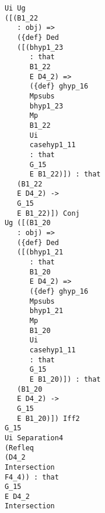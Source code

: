 \documentclass[12pt]{article}
\begin{document}
\begin{verbatim}
                                     Ui Ug 
                                     ([(B1_22 
                                        : obj) => 
                                        ({def} Ded 
                                        ([(bhyp1_23 
                                           : that 
                                           B1_22 
                                           E D4_2) => 
                                           ({def} ghyp_16 
                                           Mpsubs 
                                           bhyp1_23 
                                           Mp 
                                           B1_22 
                                           Ui 
                                           casehyp1_11 
                                           : that 
                                           G_15 
                                           E B1_22)]) : that 
                                        (B1_22 
                                        E D4_2) -> 
                                        G_15 
                                        E B1_22)]) Conj 
                                     Ug ([(B1_20 
                                        : obj) => 
                                        ({def} Ded 
                                        ([(bhyp1_21 
                                           : that 
                                           B1_20 
                                           E D4_2) => 
                                           ({def} ghyp_16 
                                           Mpsubs 
                                           bhyp1_21 
                                           Mp 
                                           B1_20 
                                           Ui 
                                           casehyp1_11 
                                           : that 
                                           G_15 
                                           E B1_20)]) : that 
                                        (B1_20 
                                        E D4_2) -> 
                                        G_15 
                                        E B1_20)]) Iff2 
                                     G_15 
                                     Ui Separation4 
                                     (Refleq 
                                     (D4_2 
                                     Intersection 
                                     F4_4)) : that 
                                     G_15 
                                     E D4_2 
                                     Intersection 

\end{verbatim}
\end{document}
